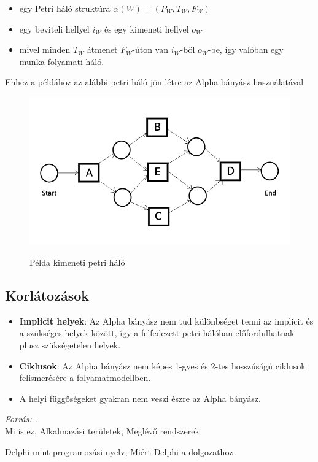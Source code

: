 \begin{itemize}
\item egy Petri háló struktúra $\alpha (W) = (P_W, T_W, F_W)$
\item egy beviteli hellyel $i_W$ és egy kimeneti hellyel $o_W$
\item mivel minden $T_W$ átmenet $F_W$-úton van $i_W$-ből $o_W$-be, így valóban egy munka\hyp{}folyamati háló.
\end{itemize}

\noindent Ehhez a példához az alábbi petri háló jön létre az Alpha bányász használatával
\begin{figure}[h]
\caption{Példa kimeneti petri háló}
\begin{center}
\includegraphics[width=\textwidth,height=\textheight,keepaspectratio]{images/img_alpha_petri_output}\\
\label{fig:example}
\end{center}
\end{figure}

 \newpage

\subsection{Korlátozások}
\begin{itemize}
\item \textbf{Implicit helyek}: Az Alpha bányász nem tud különbséget tenni az implicit és a szükséges helyek között, így a felfedezett petri hálóban előfordulhatnak plusz szükségetelen helyek.
\item \textbf{Ciklusok}: Az Alpha bányász nem képes 1-gyes és 2-tes hosszúságú ciklusok felismerésére a folyamatmodellben.
\item A helyi függőségeket gyakran nem veszi észre az Alpha bányász.
\end{itemize}

\textit{Forrás: \cite{wiki:001}.}\\


Mi is ez, 
Alkalmazási területek, 
Meglévő rendszerek

Delphi mint programozási nyelv, 
Miért Delphi a dolgozathoz


